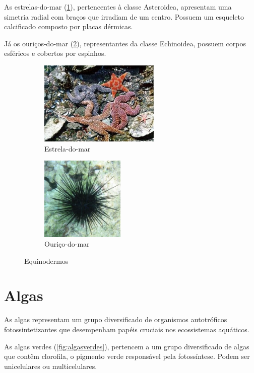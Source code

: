 \documentclass{report}
\begin{document}
As estrelas-do-mar (\ref{fig:estrela}), pertencentes à classe Asteroidea, apresentam uma simetria radial com braços que irradiam de um centro. Possuem um esqueleto calcificado composto por placas dérmicas.

Já os ouriços-do-mar (\ref{fig:ourico}), representantes da classe Echinoidea, possuem corpos esféricos e cobertos por espinhos.

\begin{figure}[H]
\center
    	\begin{subfigure}{.5\textwidth}
    	\center
        	\includegraphics[height=4cm]{imagens/estrela.jpg}
        	\caption{Estrela-do-mar}
        	\label{fig:estrela}
    	\end{subfigure}%
   	\begin{subfigure}{.5\textwidth}
    	\center
        	\includegraphics[height=4cm]{imagens/ourico.jpg}
        	\caption{Ouriço-do-mar}
       	\label{fig:ourico}
    	\end{subfigure}
    \caption{Equinodermos}
    	\label{fig:equinodermos}
\end{figure}

\section{Algas}
As algas representam um grupo diversificado de organismos autotróficos fotossintetizantes que desempenham papéis cruciais nos ecossistemas aquáticos.

As algas verdes (\ref{fig:algasverdes}), pertencem a um grupo diversificado de algas que contêm clorofila, o pigmento verde responsável pela fotossíntese. Podem ser unicelulares ou multicelulares.
\end{document}
